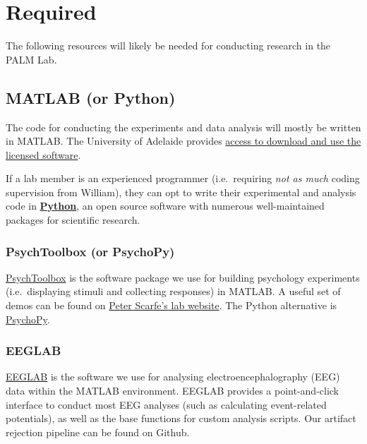 \documentclass[
]{book}
\begin{document}
\hypertarget{required}{%
\section{Required}\label{required}}

The following resources will likely be needed for conducting research in the PALM Lab.

\hypertarget{matlab-or-python}{%
\subsection*{MATLAB (or Python)}\label{matlab-or-python}}

The code for conducting the experiments and data analysis will mostly be written in MATLAB. The University of Adelaide provides \href{https://www.mathworks.com/academia/tah-portal/university-of-adelaide-30536634.html}{access to download and use the licensed software}.

If a lab member is an experienced programmer (i.e.~requiring \emph{not as much} coding supervision from William), they can opt to write their experimental and analysis code in \href{https://www.python.org/}{\textbf{Python}}, an open source software with numerous well-maintained packages for scientific research.

\hypertarget{psychtoolbox-or-psychopy}{%
\subsubsection*{PsychToolbox (or PsychoPy)}\label{psychtoolbox-or-psychopy}}

\href{http://psychtoolbox.org/}{PsychToolbox} is the software package we use for building psychology experiments (i.e.~displaying stimuli and collecting responses) in MATLAB. A useful set of demos can be found on \href{https://peterscarfe.com/ptbtutorials.html}{Peter Scarfe's lab website}. The Python alternative is \href{https://www.psychopy.org/}{PsychoPy}.

\hypertarget{eeglab}{%
\subsubsection*{EEGLAB}\label{eeglab}}

\href{https://sccn.ucsd.edu/eeglab/index.php}{EEGLAB} is the software we use for analysing electroencephalography (EEG) data within the MATLAB environment. EEGLAB provides a point-and-click interface to conduct most EEG analyses (such as calculating event-related potentials), as well as the base functions for custom analysis scripts. Our artifact rejection pipeline can be found on Github.
\end{document}
